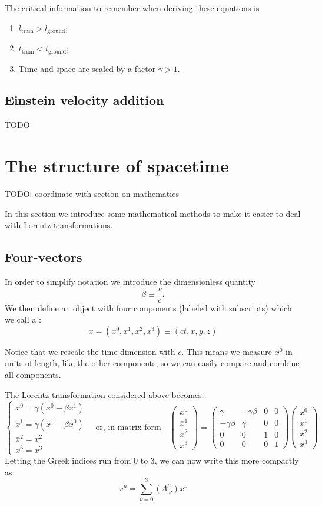 The critical information to remember when deriving these equations is
\begin{enumerate}
\item $l_\text{train} > l_\text{ground}$;
\item $t_\text{train} < t_\text{ground}$;
\item Time and space are scaled by a factor $\gamma > 1$.
\end{enumerate}

\subsection{Einstein velocity addition} TODO
\section{The structure of spacetime}
TODO: coordinate with section on mathematics

In this section we introduce some mathematical methods to make it easier to deal with Lorentz transformations. 

\subsection{Four-vectors}
In order to simplify notation we introduce the dimensionless quantity
\[ \beta \equiv \frac{v}{c}. \]
We then define an object with four components (labeled with subscripts) which we call a :
\[ x = (x^0,x^1,x^2, x^3) \equiv (ct, x,y,z) \]

Notice that we rescale the time dimension with $c$. This means we measure $x^0$ in units of length, like the other components, so we can easily compare and combine all components.

The Lorentz transformation considered above becomes:
\[ \begin{cases}
\bar{x}^0 = \gamma(x^0 - \beta x^1) \\
\bar{x}^1 = \gamma(x^1 - \beta x^0) \\
\bar{x}^2 = x^2 \\
\bar{x}^3 = x^3
\end{cases} \quad \text{or, in matrix form}\quad \begin{pmatrix}
\bar{x}^0 \\ \bar{x}^1 \\ \bar{x}^2 \\ \bar{x}^3
\end{pmatrix} = \begin{pmatrix}
\gamma & -\gamma\beta & 0 & 0 \\
-\gamma\beta & \gamma & 0 & 0 \\
0 & 0 & 1 & 0 \\
0 & 0 & 0 & 1
\end{pmatrix} \begin{pmatrix}
x^0 \\ x^1 \\ x^2 \\ x^3
\end{pmatrix} \]
Letting the Greek indices run from  $0$ to $3$, we can now write this more compactly as
\[ \bar{x}^\mu = \sum^3_{\nu=0}\left(\Lambda^\mu_{\;\nu}\right)x^\nu \]

